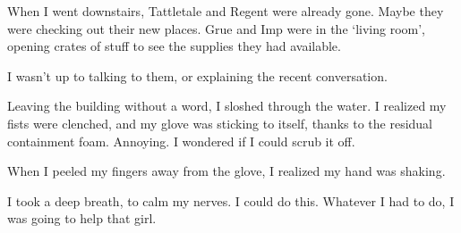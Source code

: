 When I went downstairs, Tattletale and Regent were already gone.  Maybe they were checking out their new places.  Grue and Imp were in the `living room', opening crates of stuff to see the supplies they had available.



I wasn't up to talking to them, or explaining the recent conversation.



Leaving the building without a word, I sloshed through the water.  I realized my fists were clenched, and my glove was sticking to itself, thanks to the residual containment foam.  Annoying.  I wondered if I could scrub it off.



When I peeled my fingers away from the glove, I realized my hand was shaking.



I took a deep breath, to calm my nerves.  I could do this.  Whatever I had to do, I was going to help that girl.





